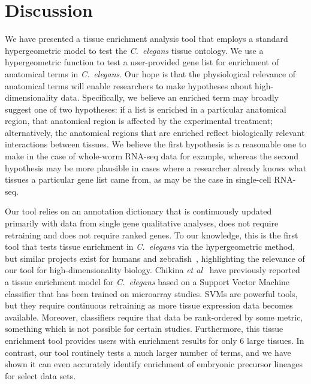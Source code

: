 \section*{Discussion}
We have presented a tissue enrichment analysis tool that employs a standard
hypergeometric model to test the \emph{C.~elegans} tissue ontology. We use a
hypergeometric function to test a user-provided gene list for enrichment of
anatomical terms in \emph{C.~elegans}. Our hope is that the physiological
relevance of anatomical terms will enable researchers to make hypotheses about
high-dimensionality data. Specifically, we believe an enriched term may broadly
suggest one of two hypotheses: if a list is enriched in a particular anatomical
region, that anatomical region is affected by the experimental treatment;
alternatively, the anatomical regions that are enriched reflect biologically
relevant interactions between tissues. We believe the first hypothesis is a
reasonable one to make in the case of whole-worm RNA-seq data for example,
whereas the second hypothesis may be more plausible in cases where a researcher
already knows what tissues a particular gene list came from, as may be the case
in single-cell RNA-seq.

Our tool relies on an annotation dictionary that is continuously updated
primarily with data from single gene qualitative analyses, does not require
retraining and does not require ranked genes. To our knowledge, this is the first
tool that tests tissue enrichment  in \emph{C.~elegans} via the hypergeometric
method, but similar projects exist for humans and zebrafish~\citep{Lee2013,
Prykhozhij2013}, highlighting the relevance of our tool for high-dimensionality
biology. Chikina \emph{et al}~\citep{Chikina2009} have previously reported a
tissue enrichment model for \emph{C.~elegans }based on a Support Vector Machine
classifier that has been trained on microarray studies. SVMs are powerful tools,
but they require continuous retraining as more tissue expression data becomes
available. Moreover, classifiers require that data be rank-ordered by some metric,
something which is not possible for certain studies. Furthermore, this tissue
enrichment tool provides users with enrichment results for only 6 large tissues.
In contrast, our tool routinely tests a much larger number of terms, and we have
shown it can even accurately identify enrichment of embryonic precursor lineages
for select data sets.

